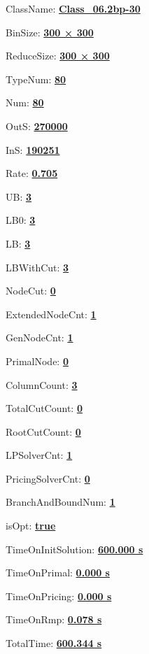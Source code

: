 \documentclass[11pt]{article}
\begin{document}
\pagestyle{empty}


ClassName: \underline{\textbf{Class_06.2bp-30}}
\par
BinSize: \underline{\textbf{300 × 300}}
\par
ReduceSize: \underline{\textbf{300 × 300}}
\par
TypeNum: \underline{\textbf{80}}
\par
Num: \underline{\textbf{80}}
\par
OutS: \underline{\textbf{270000}}
\par
InS: \underline{\textbf{190251}}
\par
Rate: \underline{\textbf{0.705}}
\par
UB: \underline{\textbf{3}}
\par
LB0: \underline{\textbf{3}}
\par
LB: \underline{\textbf{3}}
\par
LBWithCut: \underline{\textbf{3}}
\par
NodeCut: \underline{\textbf{0}}
\par
ExtendedNodeCnt: \underline{\textbf{1}}
\par
GenNodeCnt: \underline{\textbf{1}}
\par
PrimalNode: \underline{\textbf{0}}
\par
ColumnCount: \underline{\textbf{3}}
\par
TotalCutCount: \underline{\textbf{0}}
\par
RootCutCount: \underline{\textbf{0}}
\par
LPSolverCnt: \underline{\textbf{1}}
\par
PricingSolverCnt: \underline{\textbf{0}}
\par
BranchAndBoundNum: \underline{\textbf{1}}
\par
isOpt: \underline{\textbf{true}}
\par
TimeOnInitSolution: \underline{\textbf{600.000 s}}
\par
TimeOnPrimal: \underline{\textbf{0.000 s}}
\par
TimeOnPricing: \underline{\textbf{0.000 s}}
\par
TimeOnRmp: \underline{\textbf{0.078 s}}
\par
TotalTime: \underline{\textbf{600.344 s}}
\par
\newpage
\end{document}
